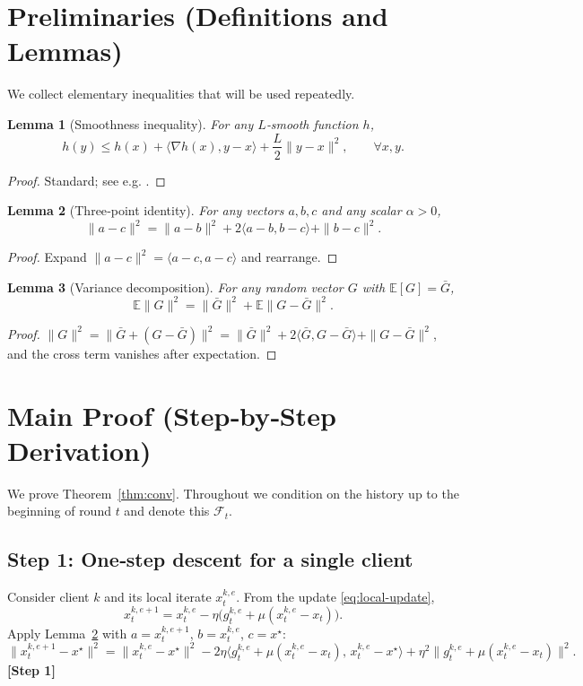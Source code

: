 \documentclass[11pt]{article}
\newtheorem{lemma}{Lemma}
\begin{document}
\section*{Preliminaries (Definitions and Lemmas)}
We collect elementary inequalities that will be used repeatedly.

\begin{lemma}[Smoothness inequality]
\label{lem:smooth}
For any $L$‑smooth function $h$,
\[
h(y)\le h(x)+\langle\nabla h(x),y-x\rangle+\frac{L}{2}\|y-x\|^2,
\qquad\forall x,y .
\]
\end{lemma}
\begin{proof}
Standard; see e.g. \cite{Nesterov2004}.
\end{proof}

\begin{lemma}[Three‑point identity]
\label{lem:three}
For any vectors $a,b,c$ and any scalar $\alpha>0$,
\[
\|a-c\|^2 = \|a-b\|^2 + 2\langle a-b, b-c\rangle + \|b-c\|^2 .
\]
\end{lemma}
\begin{proof}
Expand $\|a-c\|^2 =\langle a-c, a-c\rangle$ and rearrange.
\end{proof}

\begin{lemma}[Variance decomposition]
\label{lem:var}
For any random vector $G$ with $\mathbb{E}[G]=\bar G$,
\[
\mathbb{E}\|G\|^2 = \|\bar G\|^2 + \mathbb{E}\|G-\bar G\|^2 .
\]
\end{lemma}
\begin{proof}
$\|G\|^2 = \| \bar G + (G-\bar G)\|^2
 = \|\bar G\|^2 + 2\langle\bar G,G-\bar G\rangle + \|G-\bar G\|^2$,
and the cross term vanishes after expectation.
\end{proof}

\section*{Main Proof (Step‑by‑Step Derivation)}
We prove Theorem~\ref{thm:conv}.  Throughout we condition on the
history up to the beginning of round $t$ and denote this
$\mathcal{F}_t$.

\subsection*{Step 1: One‑step descent for a single client}
Consider client $k$ and its local iterate $x_{t}^{k,e}$.
From the update \eqref{eq:local-update},
\[
x_{t}^{k,e+1}=x_{t}^{k,e}
-\eta\big(g_{t}^{k,e}+ \mu(x_{t}^{k,e}-x_t)\big).
\tag{2}
\]
Apply Lemma~\ref{lem:three} with $a=x_{t}^{k,e+1}$, $b=x_{t}^{k,e}$,
$c=x^\star$:
\[
\|x_{t}^{k,e+1}-x^\star\|^2
= \|x_{t}^{k,e}-x^\star\|^2
-2\eta\big\langle g_{t}^{k,e}+ \mu(x_{t}^{k,e}-x_t),\,x_{t}^{k,e}-x^\star\big\rangle
+\eta^2\|g_{t}^{k,e}+ \mu(x_{t}^{k,e}-x_t)\|^2 .
\tag{3}
\]
\textbf{[Step 1]}
\end{document}
